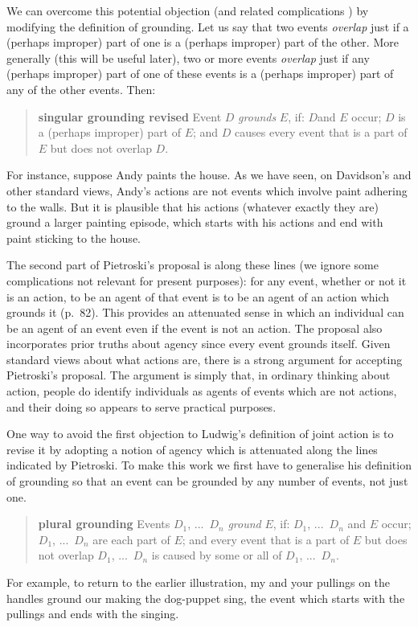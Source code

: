 \documentclass[12pt,a4paper]{extarticle}
\begin{document}
We can overcome this potential objection (and related complications%
) by modifying the definition of grounding.
Let us say that two events \emph{overlap} just if a (perhaps improper) part of one is a (perhaps improper) part of the other.
More generally (this will be useful later),
two or more events \emph{overlap} just if any (perhaps improper) part of one of these events is a (perhaps improper) part of any of the other events.
Then:
%
\begin{quote}
\textbf{singular grounding revised} 
Event $D$ \emph{grounds} $E$, if: $D$and $E$ occur; 
$D$ is a (perhaps improper) part of $E$; and 
$D$ causes every event that is a part of $E$ but does not overlap $D$.
\end{quote}
%
For instance, suppose Andy paints the house. 
As we have seen, on Davidson's and other standard views, Andy's actions are not events which involve paint adhering to the walls.  
But it is plausible that his actions (whatever exactly they are) ground a larger painting episode, which starts with his actions and end with paint sticking to the house.

The second part of Pietroski's proposal is along these lines (we ignore some complications not relevant for present purposes): for any event, whether or not it is an action, to be an agent of that event is to be an agent of an action which grounds it (p.\ 82).
This provides an attenuated sense in which an individual can be an agent of an event even if the event is not an action.
The proposal also incorporates prior truths about agency since every event grounds itself.
Given standard views about what actions are, there is a strong argument for accepting Pietroski's proposal.
The argument is simply that, in ordinary thinking about action, people do identify individuals as agents of events which are not actions, and their doing so appears to serve practical purposes.

One way to avoid the first objection to Ludwig's definition of joint action is to revise it by adopting a notion of agency which is attenuated along the lines indicated by Pietroski.
To make this work we first have to generalise his definition of grounding so that an event can be grounded by any number of events, not just one.
%
\begin{quote}
\textbf{plural grounding}
Events $D_1$, ...\ $D_n$ \emph{ground} $E$, if: $D_1$, ...\ $D_n$ and $E$ occur; 
$D_1$, ...\ $D_n$ are each part of $E$; and 
every event that is 
	a part of $E$
	but does not overlap $D_1$, ...\ $D_n$ 
is caused by some or all of $D_1$, ...\ $D_n$.
\end{quote}
%
For example, to return to the earlier illustration, my and your pullings on the handles ground our making the dog-puppet sing, the event which starts with the pullings and ends with the singing.
\end{document}

